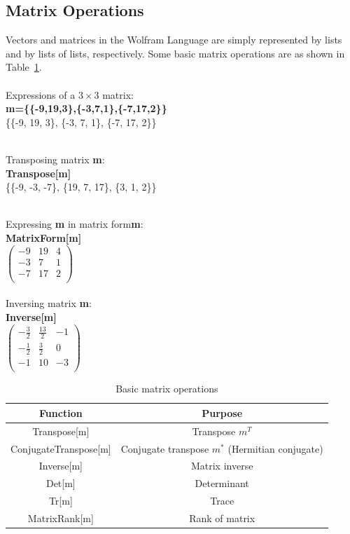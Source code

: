 \subsection{Matrix Operations}
Vectors and matrices in the Wolfram Language are simply represented by lists and by lists of lists, respectively.
Some basic matrix operations are as shown in Table~\ref{table:matrixOps}.
~\\\\
Expressions of a $3\times3$ matrix:\\
\textbf{m=\{\{-9,19,3\},\{-3,7,1\},\{-7,17,2\}\}}\\
\{\{-9, 19, 3\}, \{-3, 7, 1\}, \{-7, 17, 2\}\}

~\\
Transposing matrix \textbf{m}:\\
\textbf{Transpose[m]}\\
\{\{-9, -3, -7\}, \{19, 7, 17\}, \{3, 1, 2\}\}

~\\
Expressing \textbf{m} in matrix form\textbf{m}:\\
\textbf{MatrixForm[m]}\\
$\left(
\begin{array}{ccc}
 -9 & 19 & 4 \\
 -3 & 7 & 1 \\
 -7 & 17 & 2 \\
\end{array}
\right)$
\\~\\
Inversing matrix \textbf{m}:\\
\textbf{Inverse[m]}\\
$
\left(
\begin{array}{ccc}
 -\frac{3}{2} & \frac{13}{2} & -1 \\
 -\frac{1}{2} & \frac{3}{2} & 0 \\
 -1 & 10 & -3 \\
\end{array}
\right)
$

\begin{table}[h!]
\caption{Basic matrix operations} %
\centering %
\begin{tabular}{c c}
\hline %
Function & Purpose\\
\hline %
Transpose[m] & Transpose $m^T$ \\
ConjugateTranspose[m] & Conjugate transpose $m^*$ (Hermitian conjugate) \\
Inverse[m] & Matrix inverse\\
Det[m] & Determinant\\
Tr[m] & Trace\\
MatrixRank[m] & Rank of matrix\\
[1ex] %
\hline %
\end{tabular}
\label{table:matrixOps} %
\end{table}

